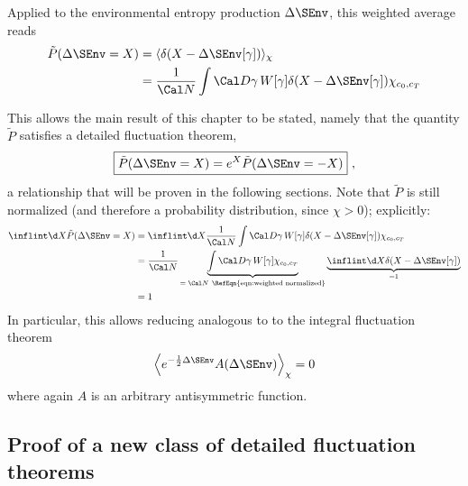 Applied to the environmental entropy production \(\Delta\SEnv\), this weighted average reads
%
\begin{equation}
	\begin{split}
	\label{eqn:P(SEnv)}
	\tilde P(\Delta\SEnv = X)
	&= \langle \delta(X-\Delta\SEnv[\gamma])\rangle_\chi \\
	&= \frac1{\Cal N} \int\Cal D\gamma \, W[\gamma] \delta(X-\Delta\SEnv[\gamma]) \chi_{c_0,c_T}
	\end{split}
\end{equation}

This allows the main result of this chapter to be stated, namely that the quantity \(\tilde P\) satisfies a detailed fluctuation theorem,
%
\begin{equation}
	\label{eqn:SEnv fluctuation theorem}
	\boxed{
		\tilde P(\Delta\SEnv = X) = e^X \tilde P(\Delta\SEnv = -X)
	}~,
\end{equation}
%
a relationship that will be proven in the following sections.
Note that \(\tilde P\) is still normalized (and therefore a probability distribution, since \(\chi > 0\)); explicitly:
\begin{equation}
	\begin{split}
	   \inflint\d X \tilde P(\Delta\SEnv = X)
	&= \inflint\d X \frac1{\Cal N} \int\Cal D\gamma \, W[\gamma] \delta(X-\Delta\SEnv[\gamma]) \chi_{c_0,c_T}
	\\
	&=  \frac1{\Cal N} \underbrace{\int\Cal D\gamma \, W[\gamma] \chi_{c_0,c_T}}_{=\; \Cal N ~ \text{\RefEqn{eqn:weighted normalized}}}
	    \underbrace{\inflint\d X \delta(X-\Delta\SEnv[\gamma])}_{=1}  \\
	&= 1
	\end{split}
\end{equation}
%
In particular, this allows reducing  analogous to  to the integral fluctuation theorem
\begin{equation}
	\label{eqn:SEnv asymmetric average}
	\left\langle e^{-\frac12\Delta\SEnv} A(\Delta\SEnv)\right\rangle_\chi = 0
\end{equation}
%
where again \(A\) is an arbitrary antisymmetric function.





\subsection{Proof of a new class of detailed fluctuation theorems}



